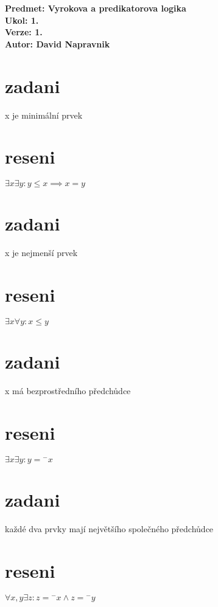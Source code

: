 \documentclass[a4paper]{article}
\begin{document}
\noindent
\textbf{Predmet: Vyrokova a predikatorova logika}\\
\textbf{Ukol: 1.}\\
\textbf{Verze: 1.}\\
\textbf{Autor: David Napravnik}

\section*{zadani}
x je minimální prvek
\section*{reseni}
$\exists x \exists y : y \leq x \implies x=y$



\section*{zadani}
x je nejmenší prvek
\section*{reseni}
$\exists x \forall y : x \leq y$


\section*{zadani}
x má bezprostředního předchůdce
\section*{reseni}
$\exists x \exists y : y = {}^-x$


\section*{zadani}
každé dva prvky mají největšího společného předchůdce
\section*{reseni}
$\forall x,y \exists z : z = {}^-x \wedge z = {}^-y$
\end{document}

